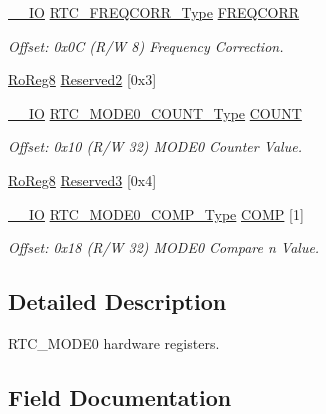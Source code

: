\begin{DoxyCompactItemize}
\mbox{\hyperlink{core__cm0plus_8h_aec43007d9998a0a0e01faede4133d6be}{\+\_\+\+\_\+\+IO}} \mbox{\hyperlink{union_r_t_c___f_r_e_q_c_o_r_r___type}{R\+T\+C\+\_\+\+F\+R\+E\+Q\+C\+O\+R\+R\+\_\+\+Type}} \mbox{\hyperlink{struct_rtc_mode0_a6895b43aadf5f05e11817146109d789a}{F\+R\+E\+Q\+C\+O\+RR}}
\begin{DoxyCompactList}\small\item\em Offset\+: 0x0C (R/W 8) Frequency Correction. \end{DoxyCompactList}\item 
\mbox{\hyperlink{group___s_a_m_d21_e15_a__definitions_ga0d957f1433aaf5d70e4dc2b68288442d}{Ro\+Reg8}} \mbox{\hyperlink{struct_rtc_mode0_a3e3d4b7e35d84b272d434a1396e8b7be}{Reserved2}} \mbox{[}0x3\mbox{]}
\item 
\mbox{\hyperlink{core__cm0plus_8h_aec43007d9998a0a0e01faede4133d6be}{\+\_\+\+\_\+\+IO}} \mbox{\hyperlink{union_r_t_c___m_o_d_e0___c_o_u_n_t___type}{R\+T\+C\+\_\+\+M\+O\+D\+E0\+\_\+\+C\+O\+U\+N\+T\+\_\+\+Type}} \mbox{\hyperlink{struct_rtc_mode0_aed00562f19cf1f8d99f3633048988f91}{C\+O\+U\+NT}}
\begin{DoxyCompactList}\small\item\em Offset\+: 0x10 (R/W 32) M\+O\+D\+E0 Counter Value. \end{DoxyCompactList}\item 
\mbox{\hyperlink{group___s_a_m_d21_e15_a__definitions_ga0d957f1433aaf5d70e4dc2b68288442d}{Ro\+Reg8}} \mbox{\hyperlink{struct_rtc_mode0_a85a9b205a274d973876024028f9ec39b}{Reserved3}} \mbox{[}0x4\mbox{]}
\item 
\mbox{\hyperlink{core__cm0plus_8h_aec43007d9998a0a0e01faede4133d6be}{\+\_\+\+\_\+\+IO}} \mbox{\hyperlink{union_r_t_c___m_o_d_e0___c_o_m_p___type}{R\+T\+C\+\_\+\+M\+O\+D\+E0\+\_\+\+C\+O\+M\+P\+\_\+\+Type}} \mbox{\hyperlink{struct_rtc_mode0_a3b5918625ce48e0b8b62c63079d85311}{C\+O\+MP}} \mbox{[}1\mbox{]}
\begin{DoxyCompactList}\small\item\em Offset\+: 0x18 (R/W 32) M\+O\+D\+E0 Compare n Value. \end{DoxyCompactList}\end{DoxyCompactItemize}


\subsection{Detailed Description}
R\+T\+C\+\_\+\+M\+O\+D\+E0 hardware registers. 

\subsection{Field Documentation}
\mbox{\label{struct_rtc_mode0_a3b5918625ce48e0b8b62c63079d85311}} 
